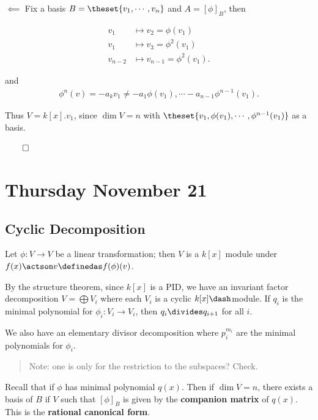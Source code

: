\(\impliedby\) Fix a basis \(B = \theset{v_1, \cdots, v_n}\) and
\(A = [\phi]_B\), then

\begin{align*}
v_1 &\mapsto v_2 = \phi(v_1) \\
v_1 &\mapsto v_3 = \phi^2(v_1) \\
v_{n-2} &\mapsto v_{n-1} = \phi^2(v_1)
.\end{align*}

and
\begin{align*}
\phi^n(v) = -a_k v_1 \neq -a_1 \phi(v_1), \cdots -a_{n-1} \phi^{n-1}(v_1)
.\end{align*}

Thus \(V = k[x].v_1\), since \(\dim V = n\) with
\(\theset{v_1, \phi(v_1), \cdots, \phi^{n-1}(v_1)}\) as a basis.

\(\qed\)

\hypertarget{thursday-november-21}{%
\section{Thursday November 21}\label{thursday-november-21}}

\hypertarget{cyclic-decomposition}{%
\subsection{Cyclic Decomposition}\label{cyclic-decomposition}}

Let \(\phi: V\to V\) be a linear transformation; then \(V\) is a
\(k[x]\) module under \(f(x) \actson v \definedas f(\phi)(v)\).

By the structure theorem, since \(k[x]\) is a PID, we have an invariant
factor decomposition \(V = \bigoplus V_i\) where each \(V_i\) is a
cyclic \(k[x]\dash\)module. If \(q_i\) is the minimal polynomial for
\(\phi_i: V_i \to V_i\), then \(q_{i} \divides q_{i+1}\) for all \(i\).

We also have an elementary divisor decomposition where \(p_i^{m_i}\) are
the minimal polynomials for \(\phi_i\).

\begin{quote}
Note: one is only for the restriction to the subspaces? Check.
\end{quote}

Recall that if \(\phi\) has minimal polynomial \(q(x)\). Then if
\(\dim V = n\), there exists a basis of \(B\) if \(V\) such that
\([\phi]_B\) is given by the \textbf{companion matrix} of \(q(x)\). This
is the \textbf{rational canonical form}.

